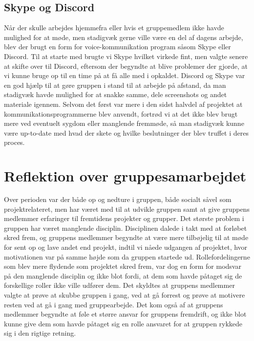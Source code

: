 \subsection*{Skype og Discord}\label{SkypeOgDiscord}
Når der skulle arbejdes hjemmefra eller hvis et gruppemedlem ikke havde mulighed for at møde, men stadigvæk gerne ville være en del af dagens arbejde, blev der brugt en form for voice-kommunikation program såsom Skype eller Discord. Til at starte med brugte vi Skype hvilket virkede fint, men valgte senere at skifte over til Discord, eftersom der begyndte at blive problemer der gjorde, at vi kunne bruge op til en time på at få alle med i opkaldet. Discord og Skype var en god hjælp til at gøre gruppen i stand til at arbejde på afstand, da man stadigvæk havde mulighed for at snakke samme, dele screenshots og andet materiale igennem. Selvom det først var mere i den sidst halvdel af projektet at kommunikationsprogrammerne blev anvendt, fortrød vi at det ikke blev brugt mere ved eventuelt sygdom eller manglende fremmøde, så man stadigvæk kunne være up-to-date med hvad der skete og hvilke beslutninger der blev truffet i deres proces.

\section{Reflektion over gruppesamarbejdet}\label{Reflektion-over-gruppesamarbejdet}
Over perioden var der både op og nedture i gruppen, både socialt såvel som projektrelateret, men har været med til at udvikle gruppen samt at give gruppens medlemmer erfaringer til fremtidens projekter og grupper. Det største problem i gruppen har været manglende disciplin. Disciplinen dalede i takt med at forløbet skred frem, og gruppens medlemmer begyndte at være mere tilbøjelig til at møde for sent op og lave andet end projekt, indtil vi nåede udgangen af projektet, hvor motivationen var på samme højde som da gruppen startede ud. Rollefordelingerne som blev mere flydende som projektet skred frem, var dog en form for modsvar på den manglende disciplin og ikke blot fordi, at dem som havde påtaget sig de forskellige roller ikke ville udfører dem. Det skyldtes at gruppens medlemmer valgte at prøve at skubbe gruppen i gang, ved at gå forrest og prøve at motivere resten ved at gå i gang med gruppearbejde. Det kom også af at gruppens medlemmer begyndte at føle et større ansvar for gruppens fremdrift, og ikke blot kunne give dem som havde påtaget sig en rolle ansvaret for at gruppen rykkede sig i den rigtige retning.

